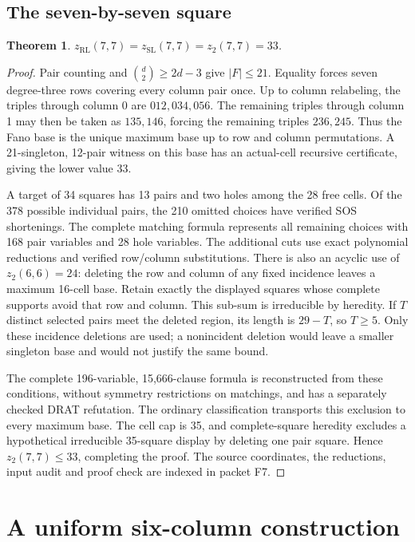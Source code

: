 \documentclass[11pt,a4paper]{article}
\newtheorem{theorem}{Theorem}[section]
\theoremstyle{definition}
\newcommand{\zr}{z_{\mathrm{RL}}}
\newcommand{\zs}{z_{\mathrm{SL}}}
\newcommand{\zt}{z_2}
\begin{document}
\subsection{The seven-by-seven square}

\begin{theorem}\label{thm:seven-square}
$\zr(7,7)=\zs(7,7)=\zt(7,7)=33$.
\end{theorem}
\begin{proof}
Pair counting and $\binom d2\ge2d-3$ give $|F|\le21$.
Equality forces seven degree-three rows covering every column pair once.
Up to column relabeling, the triples through column 0 are
$012,034,056$. The remaining triples through column 1 may then be taken as
$135,146$, forcing the remaining triples $236,245$.
Thus the Fano base is the unique maximum base up to row and column
permutations. A 21-singleton, 12-pair witness on this base has an
actual-cell recursive certificate, giving the lower value 33.

A target of 34 squares has 13 pairs and two holes among the 28 free
cells. Of the 378 possible individual pairs, the 210 omitted choices
have verified SOS shortenings. The complete matching formula represents
all remaining choices with 168 pair variables and 28 hole variables. The additional cuts use
exact polynomial reductions and verified row/column substitutions.
There is also an acyclic use of $\zt(6,6)=24$: deleting the row and
column of any fixed incidence leaves a maximum 16-cell base. Retain
exactly the displayed squares whose complete supports avoid that row
and column. This sub-sum is irreducible by heredity. If $T$ distinct
selected pairs meet the deleted region, its length is $29-T$, so
$T\ge5$. Only these incidence deletions are used;
a nonincident deletion would leave a smaller singleton base and would
not justify the same bound.

The complete 196-variable, 15,666-clause formula is reconstructed from
these conditions, without symmetry restrictions on matchings, and has
a separately checked DRAT refutation.
The ordinary classification transports this exclusion to every maximum
base. The cell cap is 35, and complete-square heredity excludes a
hypothetical irreducible 35-square display by deleting one pair square.
Hence $\zt(7,7)\le33$, completing the proof. The source coordinates,
the reductions, input audit and proof check are indexed in packet F7.
\end{proof}



\section{A uniform six-column construction}\label{sec:sixconstruction}
\end{document}
